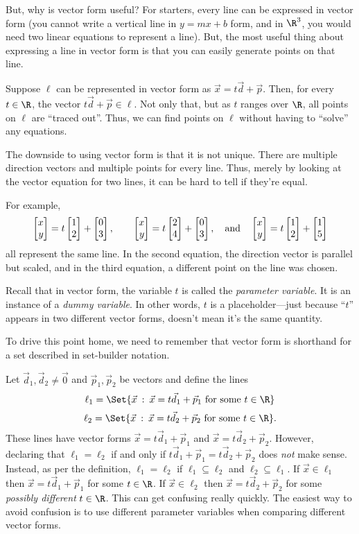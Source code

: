 But, why is vector form useful? For starters, every line can be expressed in vector form 
(you cannot write a vertical line in $y=mx+b$ form, and in $\R^3$, you would need two linear equations
to represent a line). But, the most useful thing about expressing a line in vector form is that
you can easily generate points on that line.

Suppose $\ell$ can be represented in vector form as $\vec x=t\vec d+\vec p$.
Then, for every $t\in \R$, the vector $t\vec d +\vec p\in\ell$. Not only that, but as $t$ ranges over
$\R$, all points on $\ell$ are ``traced out''. Thus, we can find points on $\ell$ without having to ``solve''
any equations.

The downside to using vector form is that it is not unique. There are multiple direction vectors and multiple points
for every line.  Thus, merely by looking at the vector equation for two lines, it can be hard to tell if
they're equal.

For example,
\[
	\mat{x\\y} = t\mat{1\\2}+\mat{0\\3},\qquad
	\mat{x\\y} = t\mat{2\\4}+\mat{0\\3},\quad\text{and}\quad
	\mat{x\\y} = t\mat{1\\2}+\mat{1\\5}
\]
all represent the same line.  In the second equation, the direction vector is parallel but scaled, and in
the third equation, a different point on the line was chosen.

Recall that in vector form, the variable $t$ is called the \emph{parameter variable}.  It is an instance of
a \emph{dummy variable}. In other words, $t$ is a placeholder---just because ``$t$'' appears in two different vector
forms, doesn't mean it's the same quantity.

To drive this point home, we need to remember that vector
form is shorthand for a set described in set-builder notation.

\bigskip
Let $\vec d_1,\vec d_2\neq\vec 0$ and $\vec p_1,\vec p_2$ be vectors and define the lines
\[
	\ell_1=\Set{\vec x\given \vec x=t\vec d_1+\vec p_1\text{ for some }t\in\R}
\]
\[
	\ell_2=\Set{\vec x\given \vec x=t\vec d_2+\vec p_2\text{ for some }t\in\R}.
\]
These lines have vector forms $\vec x=t\vec d_1+\vec p_1$ and $\vec x=t\vec d_2+\vec p_2$.
However, declaring that $\ell_1=\ell_2$ if and only if $t\vec d_1+\vec p_1=t\vec d_2+\vec p_2$
does \emph{not} make sense.   Instead, as per the definition, $\ell_1=\ell_2$ if $\ell_1\subseteq\ell_2$ and $\ell_2\subseteq\ell_1$.
If $\vec x\in\ell_1$ then $\vec x=t\vec d_1+\vec p_1$ for some $t\in\R$.  If $\vec x\in\ell_2$
then $\vec x=t\vec d_2+\vec p_2$ for some \emph{possibly different} $t\in \R$.  This can get
confusing really quickly.  The easiest way to avoid confusion is to use different parameter variables 
when comparing different vector forms.

